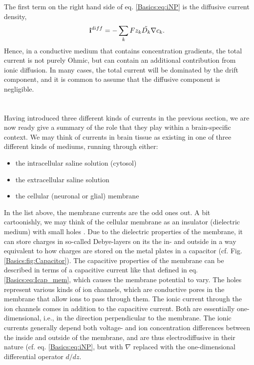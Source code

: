 The first term on the right hand side of eq. \ref{Basics:eq:iNP} is the diffusive current density, 
\begin{equation}
{\bf i}^{diff}  = -\sum_k{F z_k \tilde{D_k}{\bf \nabla} c_{k}}.
\label{Basics:eq:idiff}
\end{equation}
Hence, in a conductive medium that contains concentration gradients, the total current is not purely Ohmic, but can contain an additional contribution from ionic diffusion. In many cases, the total current will be dominated by the drift component, and it is common to assume that the diffusive component is negligible. 


\section{}
Having introduced three different kinds of currents in the previous section, we are now ready give a summary of the role that they play within a brain-specific context. We may think of currents in brain tissue as existing in one of three different kinds of mediums, running through either: 
\begin{itemize}
\item the intracellular saline solution (cytosol)
\item the extracellular saline solution
\item the cellular (neuronal or glial) membrane
\end{itemize}

In the list above, the membrane currents are the odd ones out. A bit cartoonishly, we may think of the cellular membrane as an insulator (dielectric medium) with small holes . Due to the dielectric properties of the membrane, it can store charges in so-called Debye-layers on its the in- and outside in a way equivalent to how charges are stored on the metal plates in a capacitor (cf. Fig.\ref{Basics:fig:Capacitor}). The capacitive properties of the membrane can be described in terms of a capacitive current like that defined in eq. \ref{Basics:eq:Icap_mem}, which causes the membrane potential to vary. The holes represent various kinds of ion channels, which are conductive pores in the membrane that allow ions to pass through them. The ionic current through the ion channels comes in addition to the capacitive current. Both are essentially one-dimensional, i.e., in the direction perpendicular to the membrane. The ionic currents generally depend both voltage- and ion concentration differences between the inside and outside of the membrane, and are thus electrodiffusive in their nature (cf. eq. \ref{Basics:eq:iNP}, but with $\nabla$ replaced with the one-dimensional differential operator $d/dz$. 

